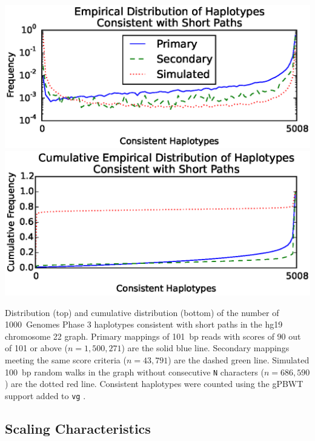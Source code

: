 \begin{FPfigure}
\centering
\includegraphics[width=\linewidth]{figures/03_gpbwt/histogram.eps}
\includegraphics[width=\linewidth]{figures/03_gpbwt/cumulative.eps}
\caption[Consistent haplotypes]{Distribution (top) and cumulative distribution (bottom) of the number of 1000~Genomes Phase 3 haplotypes consistent with short paths in the hg19 chromosome 22 graph. Primary mappings of 101~bp reads with scores of 90 out of 101 or above ($n=1,500,271$) are the solid blue line. Secondary mappings meeting the same score criteria ($n=43,791$) are the dashed green line. Simulated 100~bp random walks in the graph without consecutive \texttt{N} characters ($n=686,590$) are the dotted red line. Consistent haplotypes were counted using the gPBWT support added to \texttt{vg} \cite{garrison2016vg}.}
\label{fig:consistenthaplotypes}
\end{FPfigure}




\subsection{Scaling Characteristics}

